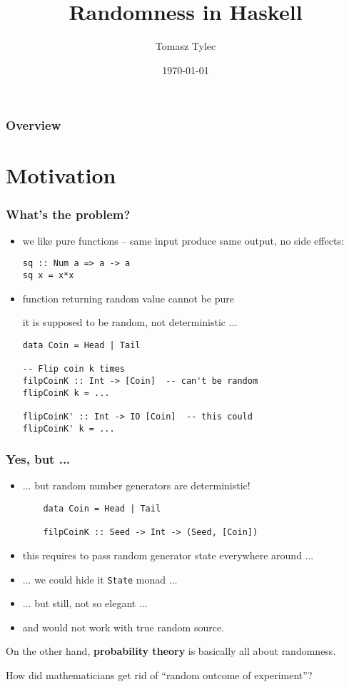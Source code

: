 \documentclass[mathserif, 8pt]{beamer}
\title[Randomness in Haskell]{Randomness in Haskell}
\author{Tomasz Tylec} %
\institute[IFR/M-ZF]
{
IF Research Polska / Mazars -- Zettafox
\medskip
\textit{tomasz.tylec@ifresearch.pl}
}
\date{\today} %
\newcommand{\remark}[1]{{\footnotesize#1\par}}
\begin{document}
\begin{frame}
\titlepage %
\end{frame}

\begin{frame}
\frametitle{Overview}
\tableofcontents
\end{frame}

\section{Motivation}

\begin{frame}[fragile]
  \frametitle{What's the problem?}

  \begin{itemize}
  \item we like pure functions -- same input produce same output, no side
    effects:

\begin{verbatim}
sq :: Num a => a -> a
sq x = x*x
\end{verbatim}

  \item function returning random value \alert{cannot be pure}\\
    \remark{it is supposed to be random, not deterministic ...}

\begin{verbatim}
data Coin = Head | Tail

-- Flip coin k times
filpCoinK :: Int -> [Coin]  -- can't be random
flipCoinK k = ...

flipCoinK' :: Int -> IO [Coin]  -- this could
flipCoinK' k = ...
\end{verbatim}
  \end{itemize}
\end{frame}

\begin{frame}[fragile]
  \frametitle{Yes, but ...}
  \begin{itemize}
  \item ... but random number generators are deterministic!

\begin{verbatim}
    data Coin = Head | Tail

    filpCoinK :: Seed -> Int -> (Seed, [Coin])
\end{verbatim}

  \item this requires to pass random generator state everywhere around ...
  \item ... we could hide it \verb|State| monad ...
  \item ... but still, not so elegant ...
  \item and would not work with true random source.
  \end{itemize}

  On the other hand, \textbf{probability theory} is basically
  all about randomness.

  \alert{How did mathematicians get rid of ``random outcome of experiment''?}
\end{frame}
\end{document}
